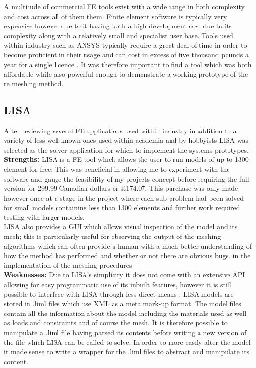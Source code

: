 \noindent
A multitude of commercial FE tools exist with a wide range in both complexity and cost across all of them them.
Finite element software is typically very expensive however due to it having both a high development cost due to its complexity along with a relatively small and specialist user base. Tools used within industry such as ANSYS typically require a great deal of time in order to become proficient in their usage and can cost in excess of five thousand pounds a year for a single licence \cite{AnsysCost}. It was therefore important to find a tool which was both affordable while also powerful enough to demonstrate a working prototype of the re meshing method.
 
\subsection{LISA}
After reviewing several FE applications used within industry in addition to a variety of less well known ones used within academia and by hobbyists LISA  was selected as the solver application for which to implement  the systems prototypes. \\ 

\noindent
\textbf{Strengths: }LISA is a FE tool which allows the user to run models of up to 1300 element for free; This was beneficial in allowing me to experiment with the software and gauge the feasibility of my projects concept before requiring the full version for 299.99 Canadian dollars or £174.07. This purchase was only made however once at a stage in the project where each sub problem had been solved for small models containing less than 1300 elements and further work required testing with larger models. \\

\noindent
LISA also provides a GUI which allows visual inspection of the model and its mesh; this is particularly useful for observing the output of the meshing algorithms which can often provide a human with a much better understanding of how the method has performed and whether or not there are obvious bugs. in the implementation of the meshing procedures \\ 

\noindent
\textbf{Weaknesses: } Due to LISA’s simplicity it does not come with an extensive API allowing for easy programmatic use of its inbuilt features, however it is still possible to interface with LISA through less direct means \cite{LISAManual}. LISA models are stored in .liml files which use XML as a meta mark-up format. The model files contain all the information about the model including the materials used as well as loads and constraints and of course the mesh. It is therefore possible to manipulate a .liml file having parsed its contents before writing a new version of the file which LISA can be called to solve. In order to more easily alter the model it made sense to write a wrapper  for the .liml files to abstract and manipulate its content. \\ 


